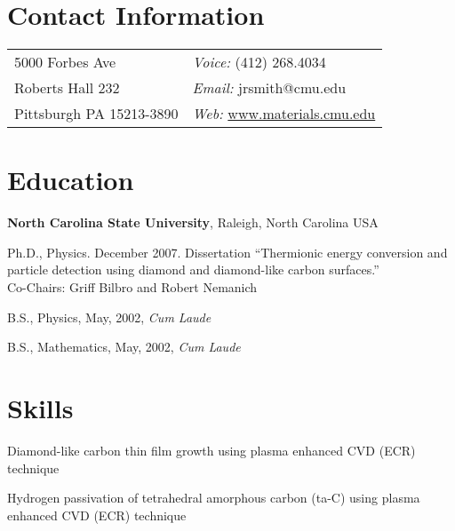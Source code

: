\documentclass[letterpaper,margin,line]{res}
\newenvironment{list1}{
  \begin{list}{\ding{113}}{%
      \setlength{\itemsep}{0in}
      \setlength{\parsep}{0in} \setlength{\parskip}{0in}
      \setlength{\topsep}{0in} \setlength{\partopsep}{0in} 
      \setlength{\leftmargin}{0.17in}}}{\end{list}}
\begin{document}

\begin{resume}
\section{\sc Contact Information}
\vspace{.05in}
\begin{tabular}{@{}p{2in}p{4in}}
5000 Forbes Ave 		& {\it Voice:} (412) 268.4034\\
Roberts Hall 232        	& {\it Email:} {jrsmith@cmu.edu} \\
Pittsburgh PA 15213-3890	& {\it Web:} \href{http://www.materials.cmu.edu}{www.materials.cmu.edu}
\end{tabular}


\section{\sc Education}

{\bf North Carolina State University}, Raleigh, North Carolina USA\\
\vspace*{-.1in}
\begin{list1}
\item[] Ph.D., Physics. December 2007. Dissertation ``Thermionic energy conversion and particle detection using diamond and diamond-like carbon surfaces.'' \\Co-Chairs: Griff Bilbro and Robert Nemanich
\item[] B.S., Physics,  May, 2002, \textit{Cum Laude}
\item[] B.S., Mathematics, May, 2002, \textit{Cum Laude}
\end{list1}



\section{\sc Skills} 
Diamond-like carbon thin film growth using plasma enhanced CVD (ECR) technique

\vspace*{-2.5mm}
Hydrogen passivation of tetrahedral amorphous carbon (ta-C) using plasma enhanced CVD (ECR) technique


\end{resume}
\end{document}
